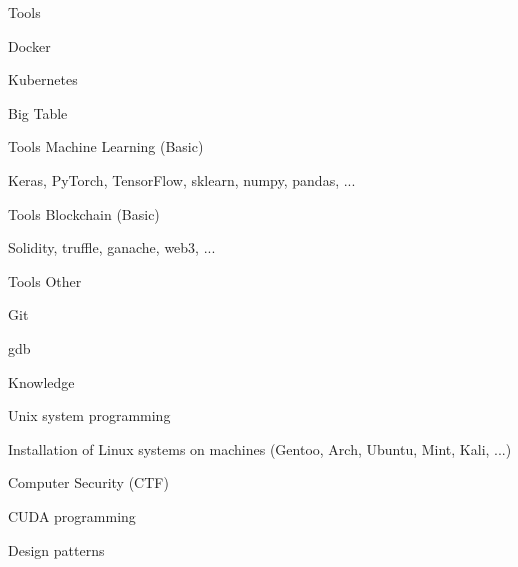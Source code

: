 \begin{cventries}
  \cventry
  {Tools}
  {}
  {}
  {}
  {
    \begin{cvitems}
      \item {Docker}
      \item {Kubernetes}
      \item {Big Table}
    \end{cvitems}
  }

  \cventry
  {Tools}
  {Machine Learning (Basic)}
  {}
  {}
  {
    \begin{cvitems}
      \item {Keras, PyTorch, TensorFlow, sklearn, numpy, pandas, ...}
    \end{cvitems}
  }

  \cventry
  {Tools}
  {Blockchain (Basic)}
  {}
  {}
  {
    \begin{cvitems}
      \item {Solidity, truffle, ganache, web3, ...}
    \end{cvitems}
  }

  \cventry
  {Tools}
  {Other}
  {}
  {}
  {
    \begin{cvitems}
      \item {Git}
      \item {gdb}
    \end{cvitems}
  }

  \cventry
  {Knowledge}
  {}
  {}
  {}
  {
    \begin{cvitems}
      \item {Unix system programming}
      \item {Installation of Linux systems on machines (Gentoo, Arch, Ubuntu, Mint, Kali, ...)}
      \item {Computer Security (CTF)}
      \item {CUDA programming}
      \item {Design patterns}
    \end{cvitems}
  }


\end{cventries}
